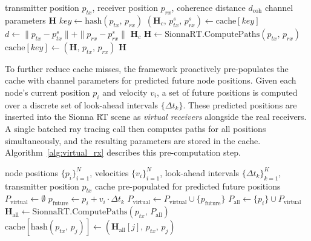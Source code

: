 \begin{algorithm}[t]
    \caption{Propagation Query with Coherence Cache}
    \label{alg:cache_query}
    \begin{algorithmic}[1]
        \REQUIRE transmitter position $p_{tx}$, receiver position $p_{rx}$, coherence distance $d_\mathrm{coh}$
        \ENSURE channel parameters $\mathbf{H}$
        \STATE $\mathit{key} \leftarrow \mathrm{hash}(p_{tx},\, p_{rx})$
        \STATE $(\mathbf{H}_c,\, p_{tx}^s,\, p_{rx}^s) \leftarrow \mathrm{cache}[\mathit{key}]$
        \STATE $d \leftarrow \|p_{tx} - p_{tx}^s\| + \|p_{rx} - p_{rx}^s\|$
        \RETURN $\mathbf{H}_c$ \hfill {}
        \ENDIF
        \ENDIF
        \STATE $\mathbf{H} \leftarrow \mathrm{SionnaRT.ComputePaths}(p_{tx},\, p_{rx})$ \hfill {}
        \STATE $\mathrm{cache}[\mathit{key}] \leftarrow (\mathbf{H},\, p_{tx},\, p_{rx})$
        \RETURN $\mathbf{H}$
    \end{algorithmic}
\end{algorithm}

To further reduce cache misses, the framework proactively pre-populates the cache with channel parameters for predicted future node positions.
Given each node's current position $p_i$ and velocity $v_i$, a set of future positions is computed over a discrete set of look-ahead intervals $\{\Delta t_k\}$.
These predicted positions are inserted into the Sionna RT scene as \emph{virtual receivers} alongside the real receivers.
A single batched ray tracing call then computes paths for all positions simultaneously, and the resulting parameters are stored in the cache.
Algorithm~\ref{alg:virtual_rx} describes this pre-computation step.

\begin{algorithm}[t]
    \caption{Adaptive Virtual Receiver Generation}
    \label{alg:virtual_rx}
    \begin{algorithmic}[1]
        \REQUIRE node positions $\{p_i\}_{i=1}^{N}$, velocities $\{v_i\}_{i=1}^{N}$, look-ahead intervals $\{\Delta t_k\}_{k=1}^{K}$, transmitter position $p_{tx}$
        \ENSURE cache pre-populated for predicted future positions
        \STATE $P_\mathrm{virtual} \leftarrow \emptyset$
        \STATE $p_\mathrm{future} \leftarrow p_i + v_i \cdot \Delta t_k$
        \STATE $P_\mathrm{virtual} \leftarrow P_\mathrm{virtual} \cup \{p_\mathrm{future}\}$
        \ENDFOR
        \ENDFOR
        \STATE $P_\mathrm{all} \leftarrow \{p_i\} \cup P_\mathrm{virtual}$ \hfill {}
        \STATE $\mathbf{H}_\mathrm{all} \leftarrow \mathrm{SionnaRT.ComputePaths}(p_{tx},\, P_\mathrm{all})$ \hfill {}
        \STATE $\mathrm{cache}[\mathrm{hash}(p_{tx},\, p_j)] \leftarrow (\mathbf{H}_\mathrm{all}[j],\, p_{tx},\, p_j)$
        \ENDFOR
    \end{algorithmic}
\end{algorithm}

